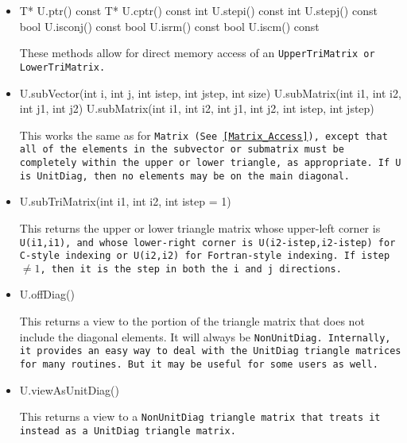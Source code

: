 \begin{itemize}
\item
\begin{tmvcode}
T* U.ptr()
const T* U.cptr() const
int U.stepi() const
int U.stepj() const
bool U.isconj() const
bool U.isrm() const
bool U.iscm() const
\end{tmvcode}
These methods allow for direct memory access of an \tt{UpperTriMatrix} or \tt{LowerTriMatrix}.

\item
\begin{tmvcode}
U.subVector(int i, int j, int istep, int jstep, int size)
U.subMatrix(int i1, int i2, int j1, int j2)
U.subMatrix(int i1, int i2, int j1, int j2, int istep, int jstep)
\end{tmvcode}
This works the same as for \tt{Matrix}
(See \ref{Matrix_Access}),
except that all of the elements in the 
subvector or submatrix must be completely within the upper or lower triangle, as
appropriate.  If \tt{U} is \tt{UnitDiag}, then no elements may be on the 
main diagonal.

\item
\begin{tmvcode}
U.subTriMatrix(int i1, int i2, int istep = 1)
\end{tmvcode}
This returns the upper or lower triangle matrix whose upper-left
corner is \tt{U(i1,i1)}, and whose lower-right corner is 
\tt{U(i2-istep,i2-istep)} for C-style indexing or \tt{U(i2,i2)} 
for Fortran-style indexing.  If \tt{istep} $\neq 1$, then it is the 
step in both the \tt{i} and \tt{j} directions.

\item
\begin{tmvcode}
U.offDiag()
\end{tmvcode}
This returns a view to the portion of the triangle matrix that does not include
the diagonal elements.  It will always be \tt{NonUnitDiag}.
Internally, it provides an easy way to deal with the \tt{UnitDiag} triangle matrices
for many routines.  But it may be useful for some users as well.

\item
\begin{tmvcode}
U.viewAsUnitDiag()
\end{tmvcode}
This returns a view to a \tt{NonUnitDiag} triangle matrix that treats it
instead as a \tt{UnitDiag} triangle matrix.


\end{itemize}
